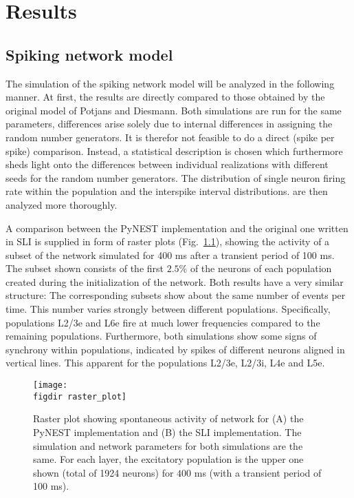 \chapter{Results}
\label{sec:results}

\section{Spiking network model}
The simulation of the spiking network model will be analyzed in the following manner. 
At first, the results are directly compared to those obtained by the original 
model of Potjans and Diesmann. Both simulations are run for the same parameters, 
differences arise solely due to internal differences in assigning the random 
number generators. It is therefor not feasible to do a direct (spike per spike) 
comparison. Instead, a statistical description is chosen which furthermore sheds light
onto the differences between individual realizations with different seeds for the 
random number generators.
The distribution of single neuron firing rate within the population
and the interspike interval distributions.
are then analyzed more thoroughly. 

A comparison between the PyNEST implementation and the original one written in SLI
is supplied in form of raster plots (Fig.~\ref{fig:raster_plot}), 
showing the activity of a subset of the network simulated for 400 ms 
after a transient period of 100 ms. The subset shown consists of the first 
$2.5 \%$ of the neurons of each population created during the initialization of the network. 
Both results have a very similar structure: 
The corresponding subsets show about the same number of events per time. This 
number varies strongly between different populations. Specifically, populations L2/3e and L6e 
fire at much lower frequencies compared to the remaining populations. 
Furthermore, both simulations show some signs of synchrony within populations, indicated by spikes 
of different neurons aligned in vertical lines. This apparent for the populations L2/3e, L2/3i, L4e and 
L5e.
\begin{figure}[tb]
    \centering
    \texttt{[image: \\figdir raster\_plot]}
    \caption[Raster plot: PyNEST and SLI]{
        Raster plot showing spontaneous activity of network for 
        (A) the PyNEST implementation and (B) the SLI implementation.
        The simulation and network parameters for both simulations are 
        the same. 
        For each layer, the excitatory population is the upper one shown 
        (total of 1924 neurons) for $400$ ms (with a transient period of 100 ms). 
    }
    \label{fig:raster_plot}
\end{figure}

